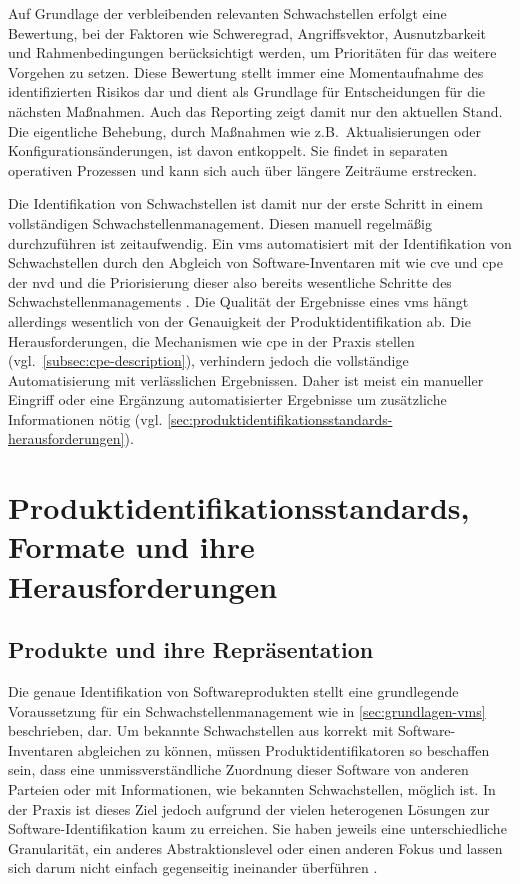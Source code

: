 Auf Grundlage der verbleibenden relevanten Schwachstellen erfolgt eine Bewertung, bei der Faktoren wie Schweregrad, Angriffsvektor, Ausnutzbarkeit und Rahmenbedingungen berücksichtigt werden, um Prioritäten für das weitere Vorgehen zu setzen.
Diese Bewertung stellt immer eine Momentaufnahme des identifizierten Risikos dar und dient als Grundlage für Entscheidungen für die nächsten Maßnahmen.
Auch das Reporting zeigt damit nur den aktuellen Stand.
Die eigentliche Behebung, durch Maßnahmen wie z.B.\ Aktualisierungen oder Konfigurationsänderungen, ist davon entkoppelt.
Sie findet in separaten operativen Prozessen und kann sich auch über längere Zeiträume erstrecken.

Die Identifikation von Schwachstellen ist damit nur der erste Schritt in einem vollständigen Schwachstellenmanagement.
Diesen manuell regelmäßig durchzuführen ist zeitaufwendig.
Ein \acrshort{vms} automatisiert mit der Identifikation von Schwachstellen durch den Abgleich von Software-Inventaren mit  wie \acrshort{cve} und \acrshort{cpe} der \acrshort{nvd} und die Priorisierung dieser also bereits wesentliche Schritte des Schwachstellenmanagements \autocite{Idrissi_Sebai_Faroukhi_Mahouachi_2024}.
Die Qualität der Ergebnisse eines \acrshort{vms} hängt allerdings wesentlich von der Genauigkeit der Produktidentifikation ab.
Die Herausforderungen, die Mechanismen wie \acrshort{cpe} in der Praxis stellen (vgl.\ \autoref{subsec:cpe-description}), verhindern jedoch die vollständige Automatisierung mit verlässlichen Ergebnissen.
Daher ist meist ein manueller Eingriff oder eine Ergänzung automatisierter Ergebnisse um zusätzliche Informationen nötig (vgl. \autoref{sec:produktidentifikationsstandards-herausforderungen}).


\section{Produktidentifikationsstandards, Formate und ihre Herausforderungen}\label{sec:produktidentifikationsstandards-herausforderungen}

\subsection{Produkte und ihre Repräsentation}\label{subsec:produkte-vs-reprasentation}

Die genaue Identifikation von Softwareprodukten stellt eine grundlegende Voraussetzung für ein Schwachstellenmanagement wie in \autoref{sec:grundlagen-vms} beschrieben, dar.
Um bekannte Schwachstellen aus  korrekt mit Software-Inventaren abgleichen zu können, müssen Produktidentifikatoren so beschaffen sein, dass eine unmissverständliche Zuordnung dieser Software von anderen Parteien oder mit Informationen, wie bekannten Schwachstellen, möglich ist.
In der Praxis ist dieses Ziel jedoch aufgrund der vielen heterogenen Lösungen zur Software-Identifikation kaum zu erreichen.
Sie haben jeweils eine unterschiedliche Granularität, ein anderes Abstraktionslevel oder einen anderen Fokus und lassen sich darum nicht einfach gegenseitig ineinander überführen \autocite{CISA2023}.

